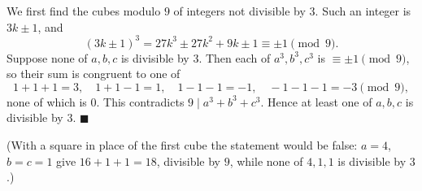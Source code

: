 We first find the cubes modulo $9$ of integers not divisible by $3$. Such an integer is $3k\pm1$, and
\[(3k\pm1)^3=27k^3\pm27k^2+9k\pm1\equiv\pm1\pmod9.\]
Suppose none of $a,b,c$ is divisible by $3$. Then each of $a^3,b^3,c^3$ is $\equiv\pm1\pmod9$, so their sum is congruent to one of
\[1+1+1=3,\quad1+1-1=1,\quad1-1-1=-1,\quad-1-1-1=-3\pmod9,\]
none of which is $0$. This contradicts $9\mid a^3+b^3+c^3$. Hence at least one of $a,b,c$ is divisible by $3$. $\blacksquare$

(With a square in place of the first cube the statement would be false: $a=4$, $b=c=1$ give $16+1+1=18$, divisible by $9$, while none of $4,1,1$ is divisible by $3$.)
